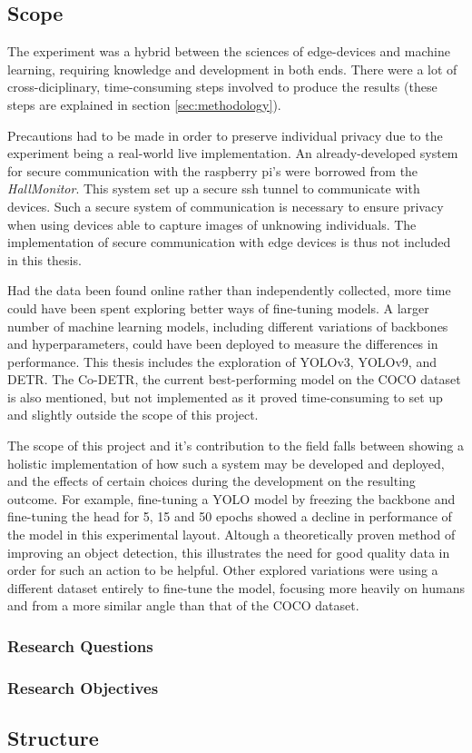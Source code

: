 \subsection{Scope}
The experiment was a hybrid between the sciences of edge-devices and machine learning, requiring knowledge and development in both ends. There were a lot of cross-diciplinary, time-consuming steps involved to produce the results (these steps are explained in section \ref{sec:methodology}).

Precautions had to be made in order to preserve individual privacy due to the experiment being a real-world live implementation. An already-developed system for secure communication with the raspberry pi's were borrowed from the \textit{HallMonitor}. This system set up a secure ssh tunnel to communicate with devices. Such a secure system of communication is necessary to ensure privacy when using devices able to capture images of unknowing individuals. The implementation of secure communication with edge devices is thus not included in this thesis.

Had the data been found online rather than independently collected, more time could have been spent exploring better ways of fine-tuning models. A larger number of machine learning models, including different variations of backbones and hyperparameters, could have been deployed to measure the differences in performance. This thesis includes the exploration of YOLOv3, YOLOv9, and DETR. The Co-DETR, the current best-performing model on the COCO dataset is also mentioned, but not implemented as it proved time-consuming to set up and slightly outside the scope of this project. 

The scope of this project and it's contribution to the field falls between showing a holistic implementation of how such a system may be developed and deployed, and the effects of certain choices during the development on the resulting outcome. For example, fine-tuning a YOLO model by freezing the backbone and fine-tuning the head for 5, 15 and 50 epochs showed a decline in performance of the model in this experimental layout. Altough a theoretically proven method of improving an object detection, this illustrates the need for good quality data in order for such an action to be helpful. Other explored variations were using a different dataset entirely to fine-tune the model, focusing more heavily on humans and from a more similar angle than that of the COCO dataset. 


\subsubsection{Research Questions}



\subsubsection{Research Objectives}

\subsection{Structure}


